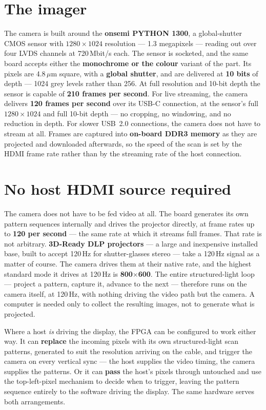 \documentclass[11pt]{article}
\begin{document}
\section{The imager}

The camera is built around the \textbf{onsemi PYTHON 1300}, a global-shutter CMOS
sensor with $1280 \times 1024$ resolution --- 1.3 megapixels --- reading out over
four LVDS channels at 720\,Mbit/s each. The sensor is socketed, and the same board
accepts either the \textbf{monochrome or the colour} variant of the part. Its
pixels are 4.8\,$\mu$m square, with a \textbf{global shutter}, and are delivered at
\textbf{10 bits} of depth --- 1024 grey levels rather than 256. At full resolution
and 10-bit depth the sensor is capable of \textbf{210 frames per second}. For live
streaming, the camera delivers \textbf{120 frames per second} over its USB-C
connection, at the sensor's full $1280 \times 1024$ and full 10-bit depth --- no
cropping, no windowing, and no reduction in depth. For slower USB~2.0 connections,
the camera does not have to stream at all. Frames are captured into \textbf{on-board
DDR3 memory} as they are projected and downloaded afterwards, so the speed of the
scan is set by the HDMI frame rate rather than by the streaming rate of the host
connection.

\section{No host HDMI source required}

The camera does not have to be fed video at all. The board generates its own
pattern sequences internally and drives the projector directly, at frame rates up
to \textbf{120 per second} --- the same rate at which it streams full frames. That
rate is not arbitrary. \textbf{3D-Ready DLP projectors} --- a large and inexpensive
installed base, built to accept 120\,Hz for shutter-glasses stereo --- take a
120\,Hz signal as a matter of course. The camera drives them at their native rate,
and the highest standard mode it drives at 120\,Hz is \textbf{800$\times$600}. The
entire structured-light loop --- project a pattern, capture it, advance to the next
--- therefore runs on the camera itself, at 120\,Hz, with nothing driving the video
path but the camera. A computer is needed only to collect the resulting images, not
to generate what is projected.

Where a host \emph{is} driving the display, the FPGA can be configured to work
either way. It can \textbf{replace} the incoming pixels with its own structured-light
scan patterns, generated to suit the resolution arriving on the cable, and trigger
the camera on every vertical sync --- the host supplies the video timing, the camera
supplies the patterns. Or it can \textbf{pass} the host's pixels through untouched
and use the top-left-pixel mechanism to decide when to trigger, leaving the pattern
sequence entirely to the software driving the display. The same hardware serves
both arrangements.
\end{document}
